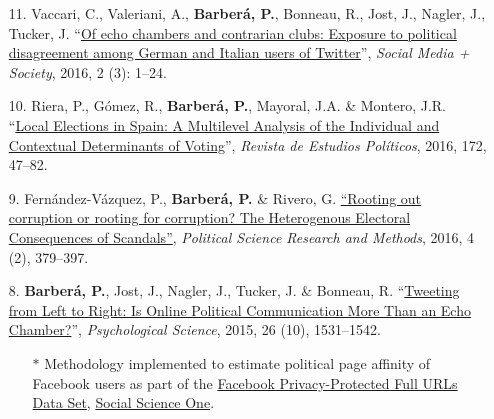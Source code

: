 \documentclass[margin,line,11pt]{resume}
\begin{document}
\begin{resume}
\begin{itemize}[leftmargin=5.5mm]
\item[11.] Vaccari, C., Valeriani, A., \textbf{Barber\'{a}, P.}, Bonneau, R., Jost, J., Nagler, J., Tucker, J. ``\href{http://sms.sagepub.com/content/2/3/2056305116664221.abstract}{Of echo chambers and contrarian clubs: Exposure to political disagreement among German and Italian users of Twitter}'', \textit{Social Media + Society}, 2016, 2 (3): 1--24.

\newpage 

\item[10.] Riera, P., G\'{o}mez, R., \textbf{Barber\'{a}, P.}, Mayoral, J.A. \& Montero, J.R. ``\href{http://www.cepc.gob.es/publicaciones/revistas/revistaselectronicas?IDR=3&IDN=1360&IDA=37721}{Local Elections in Spain: A Multilevel Analysis of the Individual and Contextual Determinants of Voting}'', \textit{Revista de Estudios Pol\'{i}ticos}, 2016, 172, 47--82.

\item[9.] Fern\'{a}ndez-V\'{a}zquez, P., \textbf{Barber\'{a}, P.} \& Rivero, G. \href{http://dx.doi.org/10.1017/psrm.2015.8}{``Rooting out corruption or rooting for corruption? The Heterogenous Electoral Consequences of Scandals''}, \textit{Political Science Research and Methods}, 2016, 4 (2), 379--397.

\item[8.] \textbf{Barber\'{a}, P.}, Jost, J., Nagler, J., Tucker, J. \& Bonneau, R. ``\href{http://pss.sagepub.com/content/early/2015/08/21/0956797615594620}{Tweeting from Left to Right: Is Online Political Communication More Than an Echo Chamber?}'', \textit{Psychological Science}, 2015, 26 (10), 1531--1542.
\begin{itemize}
\item[] $\ast$ Methodology implemented to estimate political page affinity of Facebook users as part of the \href{https://socialscience.one/files/partnershipone/files/urls-v2_1.pdf}{Facebook Privacy-Protected Full URLs Data Set}, \href{https://socialscience.one/}{Social Science One}.
\end{itemize}


\end{itemize}
\end{resume}
\end{document}
